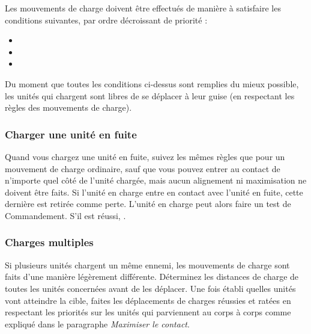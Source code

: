Les mouvements de charge doivent être effectués de manière à satisfaire les conditions suivantes, par ordre décroissant de priorité :

\begin{itemize}[label={-}]
\item {}
\item {}
\item {}
\end{itemize}

Du moment que toutes les conditions ci-dessus sont remplies du mieux possible, les unités qui chargent sont libres de se déplacer à leur guise (en respectant les règles des mouvements de charge).


\subsubsection*{Charger une unité en fuite}

Quand vous chargez une unité en fuite, suivez les mêmes règles que pour un mouvement de charge ordinaire, sauf que vous pouvez entrer au contact de n'importe quel côté de l'unité chargée, mais aucun alignement ni maximisation ne doivent être faits. Si l'unité en charge entre en contact avec l'unité en fuite, cette dernière est retirée comme perte. L'unité en charge peut alors faire un test de Commandement. S'il est réussi, .

\subsubsection*{Charges multiples}

Si plusieurs unités chargent un même ennemi, les mouvements de charge sont faits d'une manière légèrement différente. Déterminez les distances de charge de toutes les unités concernées avant de les déplacer. Une fois établi quelles unités vont atteindre la cible, faites les déplacements de charges réussies et ratées en respectant les priorités sur les unités qui parviennent au corps à corps comme expliqué dans le paragraphe \emph{Maximiser le contact}.


